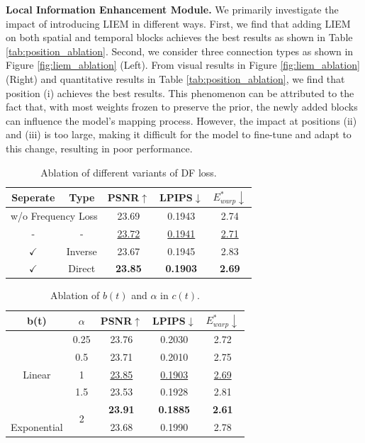 \noindent
\textbf{Local Information Enhancement Module.}
\label{sec:liem_ablation}
We primarily investigate the impact of introducing LIEM in different ways. First, we find that adding LIEM on both spatial and temporal blocks achieves the best results as shown in Table \ref{tab:position_ablation}. Second, we consider three connection types as shown in Figure \ref{fig:liem_ablation} (Left). From visual results in Figure \ref{fig:liem_ablation} (Right) and quantitative results in Table \ref{tab:position_ablation}, we find that position (i) achieves the best results. This phenomenon can be attributed to the fact that, with most weights frozen to preserve the prior, the newly added blocks can influence the model's mapping process. However, the impact at positions (ii) and (iii) is too large, making it difficult for the model to fine-tune and adapt to this change, resulting in poor performance.

\begin{table}[t]
    \centering
    \caption{Ablation of different variants of DF loss.}
    \begin{tabular}{cc|ccc}
    \hline
       Seperate & Type & PSNR$\uparrow$ & LPIPS$\downarrow$ & $E_{warp}^*\downarrow$ \\ \hline
       \multicolumn{2}{c|}{w/o Frequency Loss} & 23.69 & 0.1943 & 2.74 \\ \hline
        - & - & \underline{23.72} & \underline{0.1941} & \underline{2.71} \\
        $\checkmark$ & Inverse & 23.67 & 0.1945 & 2.83 \\
        $\checkmark$ & Direct & \cellcolor{lightgray}\textbf{23.85} & \cellcolor{lightgray}\textbf{0.1903} & \cellcolor{lightgray}\textbf{2.69} \\ \hline
    \end{tabular}
    \label{tab:daf_ablation1}
\end{table}

\begin{table}[t]
    \centering
    \caption{Ablation of $b(t)$ and $\alpha$ in $c(t)$.}
    \begin{tabular}{c|c|ccc}
    \hline
       b(t) & $\alpha$ & PSNR$\uparrow$ & LPIPS$\downarrow$ & $E_{warp}^*\downarrow$ \\ \hline
       \multirow{5}{*}{Linear} & 0.25 & 23.76 & 0.2030 & 2.72 \\
        ~ & 0.5 & 23.71 & 0.2010 & 2.75 \\
        ~ & 1 & \underline{23.85} & \underline{0.1903} & \underline{2.69} \\
        ~ & 1.5 & 23.53 & 0.1928 & 2.81 \\ \cline{2-2}
        ~ & \multirow{2}{*}{2} & \cellcolor{lightgray}\textbf{23.91} & \cellcolor{lightgray}\textbf{0.1885} & \cellcolor{lightgray}\textbf{2.61} \\ \cline{1-1}
        Exponential & ~ & 23.68 & 0.1990 & 2.78 \\
        \hline
    \end{tabular}
    \label{tab:daf_ablation2}
\end{table}

